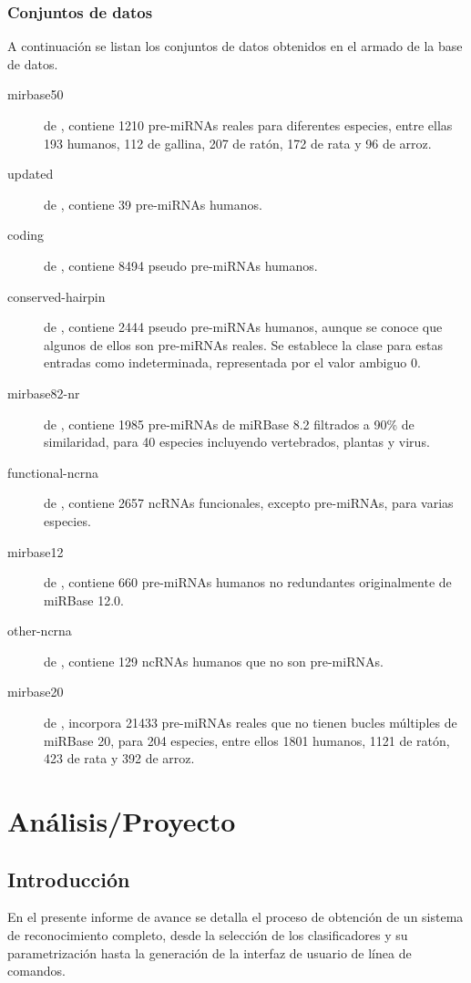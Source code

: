 \documentclass[12pt,bibliography=oldstyle,DIV=12,parskip=half-]{scrreprt}
\begin{document}
\subsection{Conjuntos de datos}
A continuación se listan los conjuntos de datos obtenidos en el armado
de la base de datos.
\begin{description}
\item[mirbase50] de \cite{xue}, contiene 1210 pre-miRNAs reales para
  diferentes especies, entre ellas 193 humanos, 112 de gallina, 207 de
  ratón, 172 de rata y 96 de arroz.
\item[updated] de \cite{xue}, contiene 39 pre-miRNAs humanos.
\item[coding] de \cite{xue}, contiene 8494 pseudo pre-miRNAs humanos.
\item[conserved-hairpin] de \cite{xue}, contiene 2444 pseudo
  pre-miRNAs humanos, aunque se conoce que algunos de ellos son
  pre-miRNAs reales. Se establece la clase para estas entradas como
  indeterminada, representada por el valor ambiguo 0.
\item[mirbase82-nr] de \cite{ng}, contiene 1985 pre-miRNAs de miRBase
  8.2 filtrados a 90\% de similaridad, para 40 especies incluyendo
  vertebrados, plantas y virus.
\item[functional-ncrna] de \cite{ng}, contiene 2657 ncRNAs
  funcionales, excepto pre-miRNAs, para varias
  especies.\item[mirbase12] de \cite{batuwita}, contiene 660
  pre-miRNAs humanos no redundantes originalmente de miRBase 12.0.
\item[other-ncrna] de \cite{batuwita}, contiene 129 ncRNAs humanos que
  no son pre-miRNAs.
\item[mirbase20] de \cite{mirbase2}, incorpora 21433 pre-miRNAs reales
  que no tienen bucles múltiples de miRBase 20, para 204 especies,
  entre ellos 1801 humanos, 1121 de ratón, 423 de rata y 392 de arroz.
\end{description}
%
%
%
\chapter{Análisis/Proyecto}
%
%
%
\section*{Introducción}
En el presente informe de avance se detalla el proceso de obtención de
un sistema de reconocimiento completo, desde la selección de los
clasificadores y su parametrización hasta la generación de la interfaz
de usuario de línea de comandos.
\end{document}
